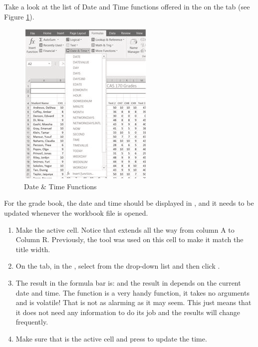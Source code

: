 Take a look at the list of Date and Time functions offered in the  on the  tab (see Figure \ref{03:fig16}).

\begin{figure}[H]
	\centering
	\includegraphics[width=\maxwidth{.95\linewidth}]{gfx/ch03_fig16}
	\caption{Date \& Time Functions}
	\label{03:fig16}
\end{figure}

For the grade book, the date and time should be displayed in , and it needs to be updated whenever the workbook file is opened.

\begin{enumerate}
	\item Make  the active cell. Notice that  extends all the way from column A to Column R. Previously, the  tool was used on this cell to make it match the title width.
	\item On the  tab, in the , select  from the  drop-down list and then click .
	\item The result in the formula bar is:  and the result in  depends on the current date and time. The  function is a very handy function, it takes no arguments and is volatile! That is not as alarming as it may seem. This just means that it does not need any information to do its job and the results will change frequently. 
	\item Make sure that  is the active cell and press   to update the time.
\end{enumerate}

